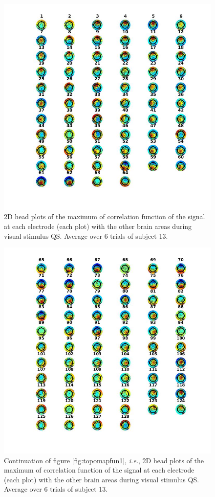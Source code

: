 \documentclass[a4paper]{article}
\begin{document}
\begin{figure}[H]
    \centering
    \includegraphics[width=16cm]{avgmap1.jpg}
    \caption{2D head plots of the maximum of correlation function of the signal at each electrode (each plot) with the other brain areas during visual stimulus QS. Average over 6 trials of subject 13.}
    \label{fig:avgmap1}
\end{figure}

\begin{figure}
    \centering
    \includegraphics[width=16cm]{avgmap2.jpg}
    \caption{Continuation of figure \ref{fig:topomapfun1}, \textit{i.e.}, 2D head plots of the maximum of correlation function of the signal at each electrode (each plot) with the other brain areas during visual stimulus QS. Average over 6 trials of subject 13.}
    \label{fig:avgmap2}
\end{figure}
\end{document}
